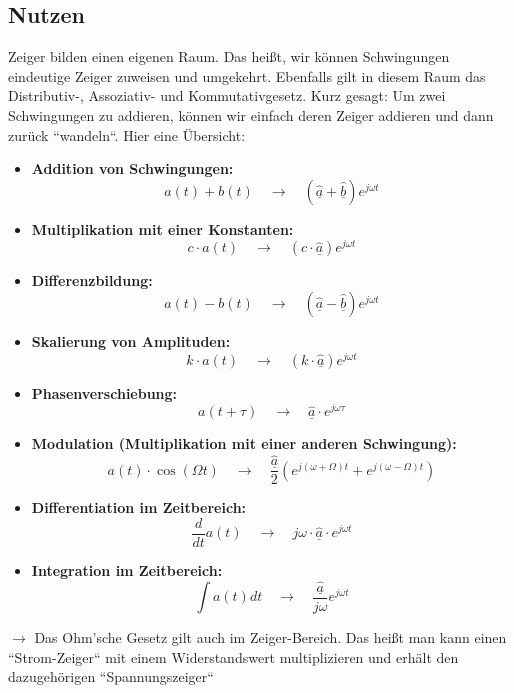 \documentclass[11pt,a4paper]{article}
\begin{document}
\raggedright



\subsection{Nutzen}
Zeiger bilden einen eigenen Raum. Das heißt, wir können Schwingungen eindeutige Zeiger zuweisen und umgekehrt. Ebenfalls gilt in diesem Raum das Distributiv-, Assoziativ- und Kommutativgesetz. Kurz gesagt: Um zwei Schwingungen zu addieren, können wir einfach deren Zeiger addieren und dann zurück ``wandeln``. Hier eine Übersicht:

\begin{itemize}
    \item \textbf{Addition von Schwingungen:} \quad 
    \[
    a(t) + b(t) \quad \rightarrow \quad (\hat{\underline{a}} + \hat{\underline{b}}) e^{j\omega t}
    \]

    \item \textbf{Multiplikation mit einer Konstanten:} \quad 
    \[
    c \cdot a(t) \quad \rightarrow \quad (c \cdot \hat{\underline{a}}) e^{j\omega t}
    \]

    \item \textbf{Differenzbildung:} \quad 
    \[
    a(t) - b(t) \quad \rightarrow \quad (\hat{\underline{a}} - \hat{\underline{b}}) e^{j\omega t}
    \]

    \item \textbf{Skalierung von Amplituden:} \quad 
    \[
    k \cdot a(t) \quad \rightarrow \quad (k \cdot \hat{\underline{a}}) e^{j\omega t}
    \]

    \item \textbf{Phasenverschiebung:} \quad 
    \[
    a(t + \tau) \quad \rightarrow \quad \hat{\underline{a}} \cdot e^{j\omega \tau}
    \]

    \item \textbf{Modulation (Multiplikation mit einer anderen Schwingung):} \quad 
    \[
    a(t) \cdot \cos(\Omega t) \quad \rightarrow \quad \frac{\hat{\underline{a}}}{2} \left( e^{j(\omega+\Omega)t} + e^{j(\omega-\Omega)t} \right)
    \]

    \item \textbf{Differentiation im Zeitbereich:} \quad 
    \[
    \frac{d}{dt} a(t) \quad \rightarrow \quad j\omega \cdot \hat{\underline{a}} \cdot e^{j\omega t}
    \]
 
    \item \textbf{Integration im Zeitbereich:} \quad 
    \[
    \int a(t) dt \quad \rightarrow \quad \frac{\hat{\underline{a}}}{j\omega} e^{j\omega t}
    \]
\end{itemize}
\vspace{1cm}
$\rightarrow$ Das Ohm'sche Gesetz gilt auch im Zeiger-Bereich. Das heißt man kann einen ``Strom-Zeiger`` mit einem Widerstandswert multiplizieren und erhält den dazugehörigen ``Spannungszeiger``
\end{document}
